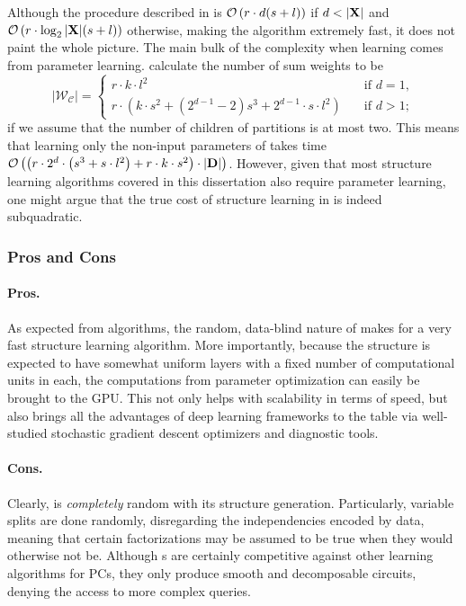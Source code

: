 Although the procedure described in  is $\mathcal{O}\left(r\cdot d(s+l)\right)$ if
$d<|\set{X}|$ and $\mathcal{O}\left(r\cdot\log_2 |\mathbf{X}|(s+l)\right)$ otherwise, making the algorithm
extremely fast, it does not paint the whole picture. The main bulk of the complexity when learning
 comes from parameter learning. \citet{peharz20a} calculate the number of sum
weights to be
\begin{equation}
  |\mathcal{W}_\mathcal{C}|=\begin{cases}
    r\cdot k\cdot l^2 & \quad\text{if $d=1$,}\\
    r\cdot\left(k\cdot s^2+(2^{d-1}-2)s^3+2^{d-1}\cdot s\cdot l^2\right) & \quad\text{if $d>1$};
  \end{cases}
\end{equation}
if we assume that the number of children of partitions is at most two. This means that learning
only the non-input parameters of  takes time $\mathcal{O}\left( \left(r\cdot 2^d
\cdot\left(s^3+s\cdot l^2\right)+r\cdot k\cdot s^2\right)\cdot|\mathbf{D}|\right)$. However, given
that most structure learning algorithms covered in this dissertation also require parameter
learning, one might argue that the true cost of structure learning in  is indeed
subquadratic.

\subsubsection{Pros and Cons}

\paragraph{Pros.} As expected from \randclass{} algorithms, the random, data-blind nature of
 makes for a very fast structure learning algorithm. More importantly, because
the structure is expected to have somewhat uniform layers with a fixed number of computational
units in each, the computations from parameter optimization can easily be brought to the GPU. This
not only helps with scalability in terms of speed, but also brings all the advantages of deep
learning frameworks to the table via well-studied stochastic gradient descent optimizers and
diagnostic tools.

\paragraph{Cons.} Clearly,  is \emph{completely} random with its structure
generation. Particularly, variable splits are done randomly, disregarding the independencies
encoded by data, meaning that certain factorizations may be assumed to be true when they would
otherwise not be. Although s are certainly competitive against other learning
algorithms for PCs, they only produce smooth and decomposable circuits, denying the access to more
complex queries.

